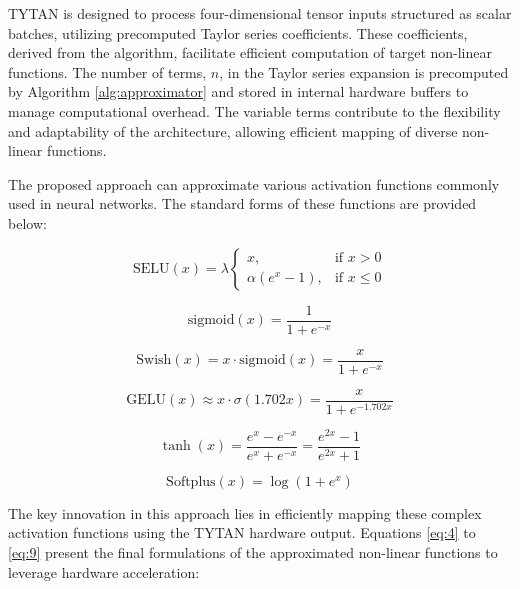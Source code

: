 \documentclass[conference,10pt]{IEEEtran}
\begin{document}
    TYTAN is designed to process four-dimensional tensor inputs structured as scalar batches, utilizing precomputed Taylor series coefficients. These coefficients, derived from the algorithm, facilitate efficient computation of target non-linear functions. The number of terms, $n$, in the Taylor series expansion is precomputed by Algorithm \ref{alg:approximator} and stored in internal hardware buffers to manage computational overhead. The variable terms contribute to the flexibility and adaptability of the architecture, allowing efficient mapping of diverse non-linear functions. 
    
    The proposed approach can approximate various activation functions commonly used in neural networks. The standard forms of these functions are provided below:
    
    \begin{equation}
        \text{SELU}(x) = \lambda 
        \begin{cases}
            x, & \text{if } x > 0 \\
            \alpha(e^x - 1), & \text{if } x \leq 0
        \end{cases}
    \end{equation}
    
    \begin{equation}
        \text{sigmoid}(x) = \frac{1}{1 + e^{-x}}
    \end{equation}
    
    \begin{equation}
        \text{Swish}(x) = x \cdot \text{sigmoid}(x) = \frac{x}{1 + e^{-x}}
    \end{equation}
    
    \begin{equation}
        \text{GELU}(x) \approx x \cdot \sigma(1.702x) = \frac{x}{1 + e^{-1.702x}}
    \end{equation}
    
    \begin{equation}
        \tanh(x) = \frac{e^x - e^{-x}}{e^x + e^{-x}} = \frac{e^{2x} - 1}{e^{2x} + 1}
    \end{equation}
    
    \begin{equation}
        \text{Softplus}(x) = \log(1 + e^x)
    \end{equation}
    
    The key innovation in this approach lies in efficiently mapping these complex activation functions using the TYTAN hardware output. Equations \ref{eq:4} to \ref{eq:9} present the final formulations of the approximated non-linear functions to leverage hardware acceleration:
    
\end{document}

